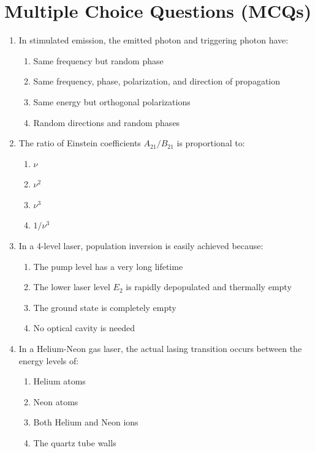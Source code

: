 \section{Multiple Choice Questions (MCQs)}

\begin{enumerate}
    \item In stimulated emission, the emitted photon and triggering photon have:
    \begin{enumerate}
        \item Same frequency but random phase
        \item Same frequency, phase, polarization, and direction of propagation
        \item Same energy but orthogonal polarizations
        \item Random directions and random phases
    \end{enumerate}
    
    \item The ratio of Einstein coefficients $A_{21}/B_{21}$ is proportional to:
    \begin{enumerate}
        \item $\nu$
        \item $\nu^2$
        \item $\nu^3$
        \item $1/\nu^3$
    \end{enumerate}
    
    \item In a 4-level laser, population inversion is easily achieved because:
    \begin{enumerate}
        \item The pump level has a very long lifetime
        \item The lower laser level $E_2$ is rapidly depopulated and thermally empty
        \item The ground state is completely empty
        \item No optical cavity is needed
    \end{enumerate}
    
    \item In a Helium-Neon gas laser, the actual lasing transition occurs between the energy levels of:
    \begin{enumerate}
        \item Helium atoms
        \item Neon atoms
        \item Both Helium and Neon ions
        \item The quartz tube walls
    \end{enumerate}
    

\end{enumerate}
